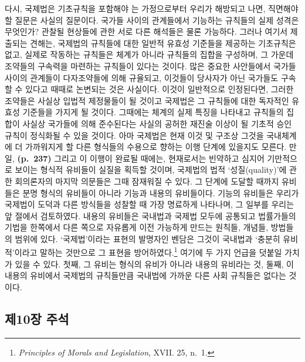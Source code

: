 다시, 국제법은 기초규칙을 포함해야 는 가정으로부터 우리가
해방되고 나면, 직면해야 할 질문은 사실의 질문이다. 국가들 사이의
관계들에서 기능하는 규칙들의 실제 성격은 무엇인가? 관찰될 현상들에 관한
서로 다른 해석들은 물론 가능하다. 그러나 여기서 제출되는 견해는,
국제법의 규칙들에 대한 일반적 유효성 기준들을 제공하는 기초규칙은 없고,
실제로 작동하는 규칙들은 체계가 아니라 규칙들의 집합을 구성하며, 그
가운데 조약들의 구속력을 마련하는 규칙들이 있다는 것이다. 많은 중요한
사안들에서 국가들 사이의 관계들이 다자조약들에 의해 규율되고, 이것들이
당사자가 아닌 국가들도 구속할 수 있다고 때때로 논변되는 것은 사실이다.
이것이 일반적으로 인정된다면, 그러한 조약들은 사실상 입법적 제정물들이
될 것이고 국제법은 그 규칙들에 대한 독자적인 유효성 기준들을 가지게 될
것이다. 그때에는 체계의 실제 특징을 나타내고 규칙들의 집합이 사실상
국가들에 의해 준수된다는 사실의 공허한 재진술 이상이 될 기초적 승인
규칙이 정식화될 수 있을 것이다. 아마 국제법은 현재 이것 및 구조상 그것을
국내체계에 더 가까워지게 할 다른 형식들의 수용으로 향하는 이행 단계에
있을지도 모른다. 만일, \textbf{(p.~237)} 그리고 이 이행이 완료될 때에는,
현재로서는 빈약하고 심지어 기만적으로 보이는 형식적 유비들이 실질을
획득할 것이며, 국제법의 법적 ‘성질(quality)’에 관한 회의론자의 마지막
의문들은 그때 잠재워질 수 있다. 그 단계에 도달할 때까지 유비들은 분명
형식의 유비들이 아니라 기능과 내용의 유비들이다. 기능의 유비들은 우리가
국제법이 도덕과 다른 방식들을 성찰할 때 가장 명료하게 나타나며, 그
일부를 우리는 앞 절에서 검토하였다. 내용의 유비들은 국내법과 국제법
모두에 공통되고 법률가들의 기법을 한쪽에서 다른 쪽으로 자유롭게 이전
가능하게 만드는 원칙들, 개념들, 방법들의 범위에 있다. ‘국제법’이라는
표현의 발명자인 벤담은 그것이 국내법과 ‘충분히 유비적’이라고 말하는
것만으로 그 표현을 방어하였다.\footnote{\emph{Principles of Morals and
  Legislation}, XVII. 25, n.~1.} 여기에 두 가지 언급을 덧붙일 가치가
있을 수 있다. 첫째, 그 유비는 형식의 유비가 아니라 내용의 유비라는 것,
둘째, 이 내용의 유비에서 국제법의 규칙들만큼 국내법에 가까운 다른 사회
규칙들은 없다는 것이다.

\newpage

\subsection{제10장 주석}\label{uxc81c10uxc7a5-uxc8fcuxc11d}


